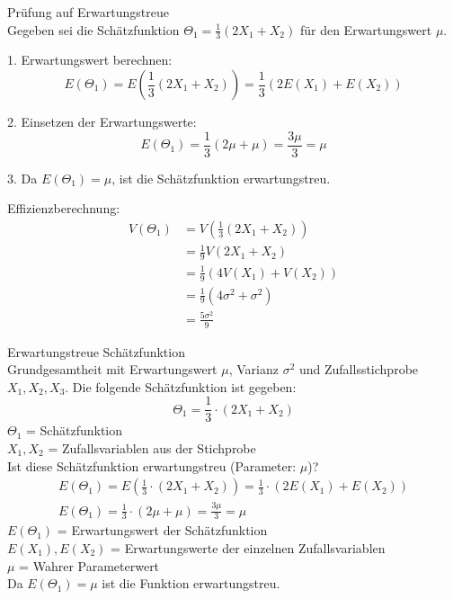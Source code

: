 \begin{example2}{Prüfung auf Erwartungstreue}\\
Gegeben sei die Schätzfunktion $\Theta_1=\frac{1}{3}(2X_1+X_2)$ für den Erwartungswert $\mu$.

1. Erwartungswert berechnen:
   $$E(\Theta_1)=E(\frac{1}{3}(2X_1+X_2))=\frac{1}{3}(2E(X_1)+E(X_2))$$

2. Einsetzen der Erwartungswerte:
   $$E(\Theta_1)=\frac{1}{3}(2\mu+\mu)=\frac{3\mu}{3}=\mu$$

3. Da $E(\Theta_1)=\mu$, ist die Schätzfunktion erwartungstreu.

Effizienzberechnung:
$$
\begin{aligned}
V(\Theta_1) &= V(\frac{1}{3}(2X_1+X_2)) \\
&= \frac{1}{9}V(2X_1+X_2) \\
&= \frac{1}{9}(4V(X_1)+V(X_2)) \\
&= \frac{1}{9}(4\sigma^2+\sigma^2) \\
&= \frac{5\sigma^2}{9}
\end{aligned}
$$
\end{example2}

\begin{example2}{Erwartungstreue Schätzfunktion}\\
Grundgesamtheit mit Erwartungswert $\mu$, Varianz $\sigma^2$ und Zufallsstichprobe $X_1, X_2, X_3$. Die folgende Schätzfunktion ist gegeben:
$$
\Theta_1=\frac{1}{3} \cdot(2X_1+X_2)
$$
$\Theta_1$ = Schätzfunktion\\
$X_1, X_2$ = Zufallsvariablen aus der Stichprobe\\

Ist diese Schätzfunktion erwartungstreu (Parameter: $\mu$)?
$$
\begin{gathered}
E(\Theta_1)=E(\frac{1}{3} \cdot(2X_1+X_2))=\frac{1}{3} \cdot(2E(X_1)+E(X_2)) \\
E(\Theta_1)=\frac{1}{3} \cdot(2\mu+\mu)=\frac{3\mu}{3}=\mu
\end{gathered}
$$
$E(\Theta_1)$ = Erwartungswert der Schätzfunktion\\
$E(X_1), E(X_2)$ = Erwartungswerte der einzelnen Zufallsvariablen\\
$\mu$ = Wahrer Parameterwert\\

Da $E(\Theta_1)=\mu$ ist die Funktion erwartungstreu.
\end{example2}


